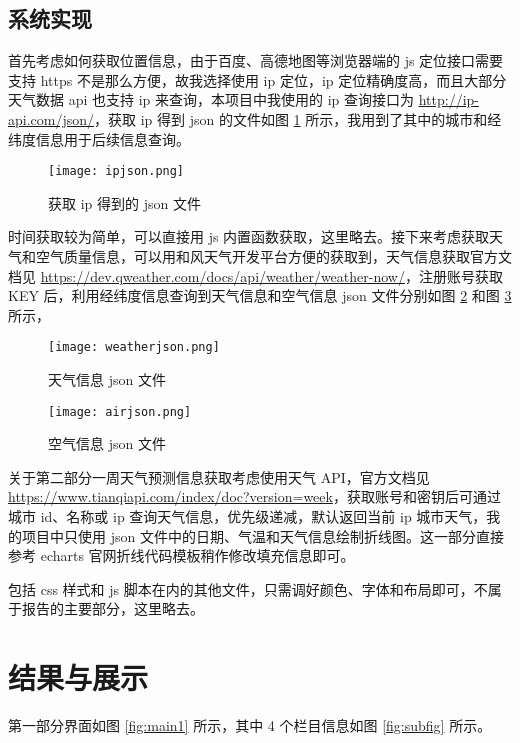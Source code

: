 \documentclass[12pt,AutoFakeBold]{article}
\begin{document}
\subsection{系统实现}

首先考虑如何获取位置信息，由于百度、高德地图等浏览器端的 js 定位接口需要支持 https 不是那么方便，故我选择使用 ip 定位，ip 定位精确度高，而且大部分天气数据 api 也支持 ip 来查询，本项目中我使用的 ip 查询接口为 \url{http://ip-api.com/json/}，获取 ip 得到 json 的文件如图 \ref{fig:ipjson} 所示，我用到了其中的城市和经纬度信息用于后续信息查询。

\begin{figure}[htbp]
	\centering
	\texttt{[image: ipjson.png]}
	\caption{获取 ip 得到的 json 文件} \label{fig:ipjson}
\end{figure}

时间获取较为简单，可以直接用 js 内置函数获取，这里略去。接下来考虑获取天气和空气质量信息，可以用和风天气开发平台方便的获取到，天气信息获取官方文档见 \url{https://dev.qweather.com/docs/api/weather/weather-now/}，注册账号获取 KEY 后，利用经纬度信息查询到天气信息和空气信息 json 文件分别如图 \ref{fig:weatherjson} 和图 \ref{fig:airjson} 所示，

\begin{figure}[htbp]
	\centering
	\texttt{[image: weatherjson.png]}
	\caption{天气信息 json 文件} \label{fig:weatherjson}
\end{figure}

\begin{figure}[htbp]
	\centering
	\texttt{[image: airjson.png]}
	\caption{空气信息 json 文件} \label{fig:airjson}
\end{figure}

关于第二部分一周天气预测信息获取考虑使用天气 API，官方文档见 \url{https://www.tianqiapi.com/index/doc?version=week}，获取账号和密钥后可通过城市 id、名称或 ip 查询天气信息，优先级递减，默认返回当前 ip 城市天气，我的项目中只使用 json 文件中的日期、气温和天气信息绘制折线图。这一部分直接参考 echarts 官网折线代码模板稍作修改填充信息即可。

包括 css 样式和 js 脚本在内的其他文件，只需调好颜色、字体和布局即可，不属于报告的主要部分，这里略去。

\section{结果与展示}

第一部分界面如图 \ref{fig:main1} 所示，其中 4 个栏目信息如图 \ref{fig:subfig} 所示。
\end{document}
